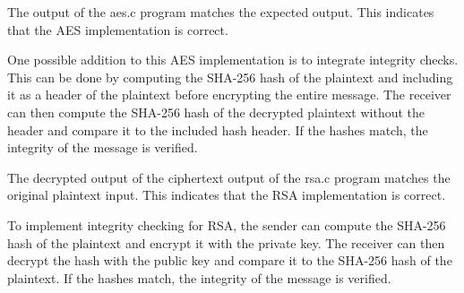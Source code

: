 The output of the aes.c program matches the expected output. 
This indicates that the AES implementation is correct.

One possible addition to this AES implementation is to integrate integrity checks.
This can be done by computing the SHA-256 hash of the plaintext and including it
as a header of the plaintext before encrypting the entire message. 
The receiver can then compute the SHA-256 hash of
the decrypted plaintext without the header and compare it to the included hash header.
If the hashes match, the integrity of the message is verified.

The decrypted output of the ciphertext output of the rsa.c program matches the original
plaintext input. This indicates that the RSA implementation is correct.

To implement integrity checking for RSA, the sender can compute the SHA-256 hash of the
plaintext and encrypt it with the private key. The receiver can then decrypt the hash
with the public key and compare it to the SHA-256 hash of the plaintext. If the hashes
match, the integrity of the message is verified.
